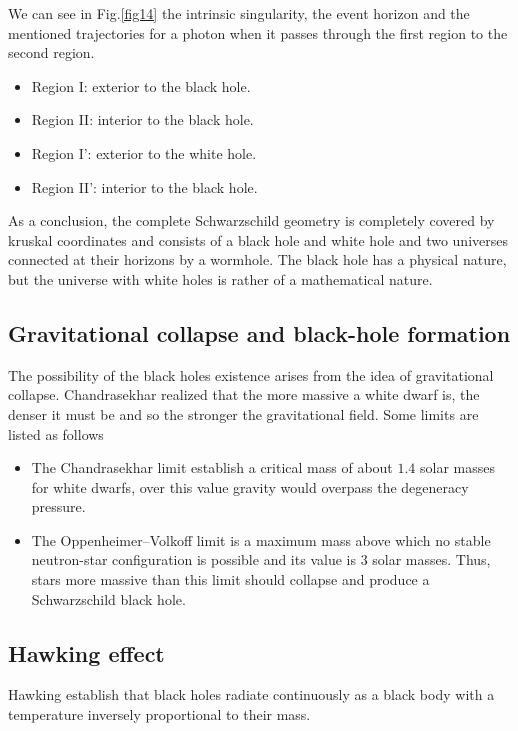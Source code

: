 \documentclass[letterpaper,11pt,onecolumn]{article}
\begin{document}
We can see in Fig.\ref{fig14} the intrinsic singularity, the event horizon and the mentioned trajectories for a photon when it passes through the first region to the second region.

\begin{itemize}
    \item Region I: exterior to the black hole.
    \item Region II: interior to the black hole.
    \item Region I': exterior to the white hole.
    \item Region II': interior to the black hole.
\end{itemize}

As a conclusion, the complete Schwarzschild geometry is completely covered by kruskal coordinates and consists of a black hole and white hole and two universes connected at their horizons by a wormhole. The black hole has a physical nature, but the universe with white holes is rather of a mathematical nature.

\subsection{Gravitational collapse and black-hole formation}

The possibility of the black holes existence arises from the idea of gravitational collapse. Chandrasekhar realized that the more massive a white dwarf is, the denser it must be and so the stronger the gravitational field. Some limits are listed as follows

\begin{itemize}
\item The Chandrasekhar limit establish a critical mass of about $1.4$ solar masses for white dwarfs, over this value gravity would overpass the degeneracy pressure.
\item The Oppenheimer–Volkoff limit is a maximum mass above which no stable neutron-star configuration is possible and its value is $3$ solar masses. Thus, stars more massive than this limit should collapse and produce a Schwarzschild black hole.
\end{itemize}

\subsection{Hawking effect}
Hawking establish that black holes radiate continuously as a black body with a temperature inversely proportional to their mass.
\end{document}
